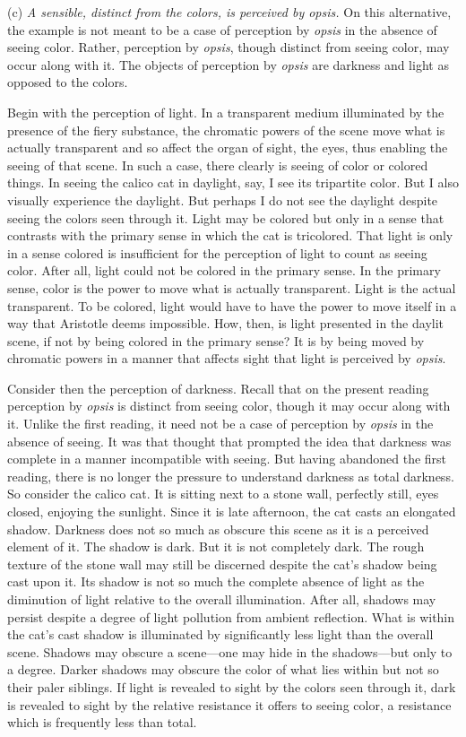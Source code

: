 (c) \emph{A sensible, distinct from the colors, is perceived by \emph{opsis}.} On this alternative, the example is not meant to be a case of perception by \emph{opsis} in the absence of seeing color. Rather, perception by \emph{opsis}, though distinct from seeing color, may occur along with it. The objects of perception by \emph{opsis} are darkness and light as opposed to the colors. 

Begin with the perception of light. In a transparent medium illuminated by the presence of the fiery substance, the chromatic powers of the scene move what is actually transparent and so affect the organ of sight, the eyes, thus enabling the seeing of that scene. In such a case, there clearly is seeing of color or colored things. In seeing the calico cat in daylight, say, I see its tripartite color. But I also visually experience the daylight. But perhaps I do not see the daylight despite seeing the colors seen through it. Light may be colored but only in a sense that contrasts with the primary sense in which the cat is tricolored. That light is only in a sense colored is insufficient for the perception of light to count as seeing color. After all, light could not be colored in the primary sense. In the primary sense, color is the power to move what is actually transparent. Light is the actual transparent. To be colored, light would have to have the power to move itself in a way that Aristotle deems impossible. How, then, is light presented in the daylit scene, if not by being colored in the primary sense? It is by being moved by chromatic powers in a manner that affects sight that light is perceived by \emph{opsis}.

Consider then the perception of darkness. Recall that on the present reading perception by \emph{opsis} is distinct from seeing color, though it may occur along with it. Unlike the first reading, it need not be a case of perception by \emph{opsis} in the absence of seeing. It was that thought that prompted the idea that darkness was complete in a manner incompatible with seeing. But having abandoned the first reading, there is no longer the pressure to understand darkness as total darkness. So consider the calico cat. It is sitting next to a stone wall, perfectly still, eyes closed, enjoying the sunlight. Since it is late afternoon, the cat casts an elongated shadow. Darkness does not so much as obscure this scene as it is a perceived element of it. The shadow is dark. But it is not completely dark. The rough texture of the stone wall may still be discerned despite the cat's shadow being cast upon it. Its shadow is not so much the complete absence of light as the diminution of light relative to the overall illumination. After all, shadows may persist despite a degree of light pollution from ambient reflection. What is within the cat's cast shadow is illuminated by significantly less light than the overall scene. Shadows may obscure a scene—one may hide in the shadows—but only to a degree. Darker shadows may obscure the color of what lies within but not so their paler siblings. If light is revealed to sight by the colors seen through it, dark is revealed to sight by the relative resistance it offers to seeing color, a resistance which is frequently less than total.

